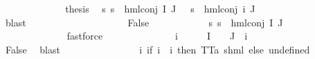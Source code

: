 \begin{isabellebody}
\ \ \ \ \ \ \ \ \ \ \isamarkupfalse%
\ \isamarkupfalse%
\ {\isacharquery}{\kern0pt}thesis\ \isamarkupfalse%
\ {\isacartoucheopen}{\isasymforall}s{\isachardot}{\kern0pt}\ s\ {\isasymTurnstile}\ {\isacharparenleft}{\kern0pt}hml{\isacharunderscore}{\kern0pt}conj\ I\ J\ {\isasymPhi}{\isacharparenright}{\kern0pt}\ {\isasymlongleftrightarrow}\ s\ {\isasymTurnstile}\ {\isacharparenleft}{\kern0pt}hml{\isacharunderscore}{\kern0pt}conj\ {\isacharbraceleft}{\kern0pt}i{\isacharunderscore}{\kern0pt}{\isasymphi}{\isacharbraceright}{\kern0pt}\ J\ {\isasymPsi}{\isacharparenright}{\kern0pt}{\isacartoucheclose}\isanewline
\ \ \ \ \ \ \ \ \ \ \ \ \isamarkupfalse%
\ blast\isanewline
\ \ \ \ \ \ \ \ \isamarkupfalse%
\isanewline
\ \ \ \ \ \ \ \ \ \ \isamarkupfalse%
\ False\isanewline
\ \ \ \ \ \ \ \ \ \ \isamarkupfalse%
\ {\isachardoublequoteopen}{\isasymforall}s{\isachardot}{\kern0pt}\ {\isasymnot}{\isacharparenleft}{\kern0pt}s\ {\isasymTurnstile}\ hml{\isacharunderscore}{\kern0pt}conj\ I\ J\ {\isasymPhi}{\isacharparenright}{\kern0pt}{\isachardoublequoteclose}\ \isanewline
\ \ \ \ \ \ \ \ \ \ \ \ \isamarkupfalse%
\ fastforce\isanewline
\ \ \ \ \ \ \ \ \ \ \isamarkupfalse%
\ \isamarkupfalse%
\ {\isasymphi}\ i{\isacharunderscore}{\kern0pt}{\isasymphi}\ \ {\isachardoublequoteopen}{\isasymphi}\ {\isasymin}\ {\isasymPhi}\ {\isacharbackquote}{\kern0pt}\ I\ {\isasyminter}\ {\isasymPhi}\ {\isacharbackquote}{\kern0pt}\ J{\isachardoublequoteclose}\ {\isachardoublequoteopen}{\isasymPhi}\ i{\isacharunderscore}{\kern0pt}{\isasymphi}\ {\isacharequal}{\kern0pt}\ {\isasymphi}{\isachardoublequoteclose}\ \isanewline
\ \ \ \ \ \ \ \ \ \ \ \ \isamarkupfalse%
\ False\ \isamarkupfalse%
\ blast\isanewline
\ \ \ \ \ \ \ \ \ \ \isamarkupfalse%
\ {\isasymPsi}\ \ {\isachardoublequoteopen}{\isasymPsi}\ {\isasymequiv}\ {\isacharparenleft}{\kern0pt}{\isasymlambda}i{\isachardot}{\kern0pt}\ {\isacharparenleft}{\kern0pt}if\ i\ {\isacharequal}{\kern0pt}\ i{\isacharunderscore}{\kern0pt}{\isasymphi}\ then\ TT{\isacharcolon}{\kern0pt}{\isacharcolon}{\kern0pt}{\isacharparenleft}{\kern0pt}{\isacharprime}{\kern0pt}a{\isacharcomma}{\kern0pt}\ {\isacharprime}{\kern0pt}s{\isacharparenright}{\kern0pt}hml\ else\ undefined{\isacharparenright}{\kern0pt}{\isacharparenright}{\kern0pt}{\isachardoublequoteclose}\isanewline
\ \ \ \ \ \ \ \ \ \ \isamarkupfalse%

\end{isabellebody}
